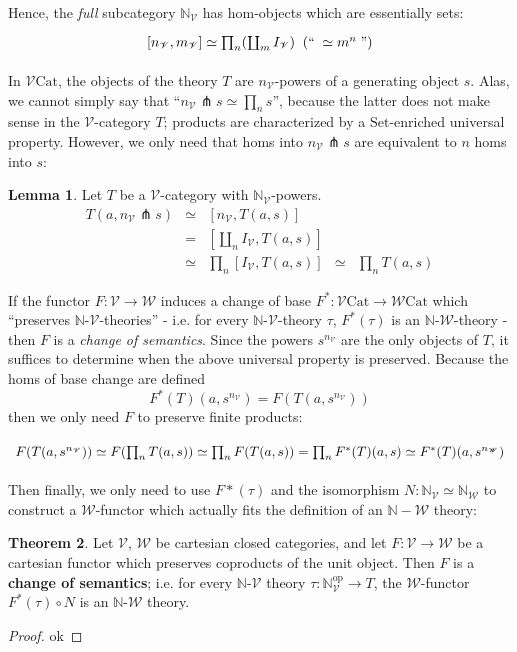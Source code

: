 \documentclass[a4paper,UKenglish]{article}
\theoremstyle{definition}
\newtheorem{theorem}{Theorem}
\newtheorem{lemma}[theorem]{Lemma}
\newcommand{\Set}{\mathrm{Set}}
\newcommand{\Cat}{\mathrm{Cat}}
\newcommand{\op}{\mathrm{op}}
\newcommand{\NN}{\mathbb{N}}
\newcommand{\V}{\mathscr{V}}
\newcommand{\W}{\mathscr{W}}
\newcommand{\pfk}{\pitchfork}
\begin{document}
Hence, the \textit{full} subcategory $\NN_\V$ has hom-objects which are essentially sets:
\[\begin{tikzcd}
\left[n_\V,m_\V\right] \simeq \prod_n (\coprod_m I_\V) \;\; (`` \; \simeq m^n \;")
\end{tikzcd}\]

In $\V\Cat$, the objects of the theory $T$ are $n_\V$-powers of a generating object $s$. Alas, we cannot simply say that ``$n_\V \pfk s \simeq \prod_n s$'', because the latter does not make sense in the $\V$-category $T$; products are characterized by a $\Set$-enriched universal property. However, we only need that homs into $n_\V \pfk s$ are equivalent to $n$ homs into $s$:

\begin{lemma}
	Let $T$ be a $\V$-category with $\NN_\V$-powers.
	\[\begin{array}{rclcl}
	T(a,n_\V \pfk s) & \simeq & [n_\V,T(a,s)] & &\\
	& = & [\coprod_n I_\V,T(a,s)] & &\\
	& \simeq & \prod_n [I_\V,T(a,s)] & \simeq & \prod_n T(a,s)
	\end{array}\]
\end{lemma}

If the functor $F:\V \to \W$ induces a change of base $F^*:\V\Cat \to \W\Cat$ which ``preserves $\NN$-$\V$-theories'' - i.e. for every $\NN$-$\V$-theory $\tau$, $F^*(\tau)$ is an $\NN$-$\W$-theory - then $F$ is a \textit{change of semantics}. Since the powers $s^{n_\V}$ are the only objects of $T$, it suffices to determine when the above universal property is preserved. Because the homs of base change are defined $$F^*(T)(a,s^{n_\V}) = F(T(a,s^{n_\V}))$$ then we only need $F$ to preserve finite products:

\[\begin{tikzcd}
F(T(a,s^{n_\V})) \simeq F(\prod_n T(a,s)) \simeq \prod_n F(T(a,s)) = \prod_n F^*(T)(a,s) \simeq F^*(T)(a,s^{n_\W})
\end{tikzcd}\]

Then finally, we only need to use $F*(\tau)$ and the isomorphism $N: \NN_\V \simeq \NN_\W$ to construct a $\W$-functor which actually fits the definition of an $\NN-\W$ theory:

\begin{theorem}
	Let $\V$, $\W$ be cartesian closed categories, and let $F: \V \to \W$ be a cartesian functor which preserves coproducts of the unit object. Then $F$ is a \textbf{change of semantics}; i.e. for every $\NN$-$\V$ theory $\tau: \NN_\V^\op \to T$, the $\W$-functor $F^*(\tau) \circ N$ is an $\NN$-$\W$ theory.
\end{theorem}
\begin{proof}
	ok
\end{proof}
\end{document}

